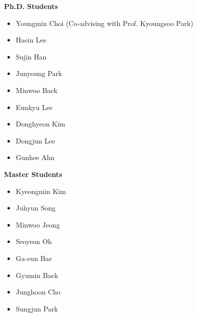 \documentclass[11pt,letterpaper]{article}
\begin{document}

  \textbf{Ph.D. Students}
  \begin{itemize}[label=--,leftmargin=1.5em]
    \small
      \item Youngmin Choi (Co-advising with Prof. Kyoungsoo Park) %
      \item Haein Lee %
      \item Sujin Han %
      \item Junyoung Park %
      \item Minwoo Baek %
      \item Eunkyu Lee %
      \item Donghyeon Kim %
      \item Dongjun Lee %
      \item Gunhee Ahn %
  \end{itemize}

  \textbf{Master Students}
  \begin{itemize}[label=--,leftmargin=1.5em]
    \small
      \item Kyeongmin Kim %
      \item Juhyun Song %
      \item Minwoo Jeong %
      \item Seoyeon Oh
      \item Ga-eun Bae
      \item Gyumin Baek
      \item Junghoon Cho
      \item Sungjun Park
  \end{itemize}
\end{document}
